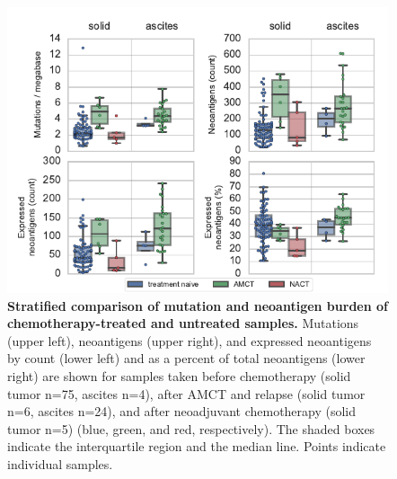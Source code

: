 \begin{figure}
\centering
\includegraphics[scale=1.0]{figures/counts.pdf}
\caption{\textbf{Stratified comparison of mutation and neoantigen burden of chemotherapy-treated and untreated samples.} Mutations (upper left), neoantigens (upper right), and expressed neoantigens by count (lower left) and as a percent of total neoantigens (lower right) are shown for samples taken before chemotherapy (solid tumor n=75, ascites n=4), after AMCT and relapse (solid tumor n=6, ascites n=24), and after neoadjuvant chemotherapy (solid tumor n=5) (blue, green, and red, respectively). The shaded boxes indicate the interquartile region and the median line. Points indicate individual samples.}
\label{fig:counts}
\end{figure}

